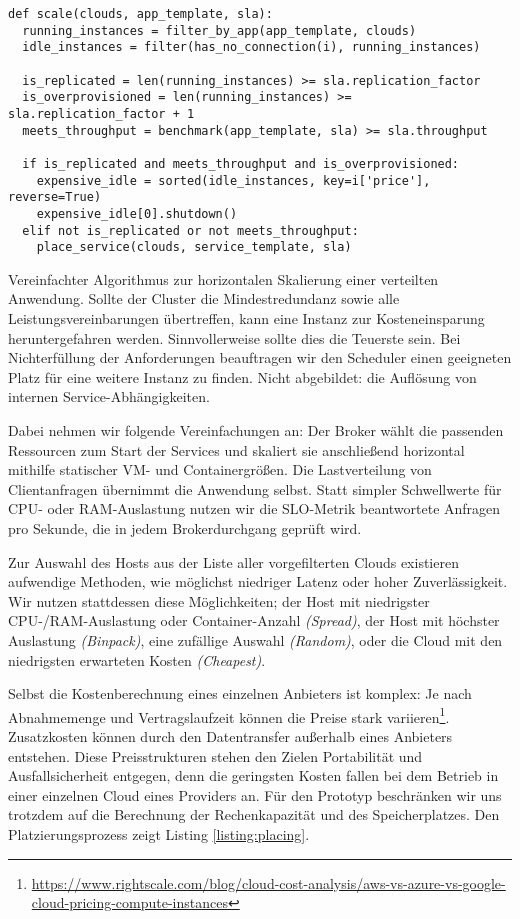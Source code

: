 \begin{listing}[ht]
\begin{verbatim}
def scale(clouds, app_template, sla):
  running_instances = filter_by_app(app_template, clouds)
  idle_instances = filter(has_no_connection(i), running_instances)
	
  is_replicated = len(running_instances) >= sla.replication_factor
  is_overprovisioned = len(running_instances) >= sla.replication_factor + 1
  meets_throughput = benchmark(app_template, sla) >= sla.throughput

  if is_replicated and meets_throughput and is_overprovisioned:
    expensive_idle = sorted(idle_instances, key=i['price'], reverse=True)
    expensive_idle[0].shutdown()
  elif not is_replicated or not meets_throughput:
    place_service(clouds, service_template, sla)
\end{verbatim}
\caption{Vereinfachter Algorithmus zur horizontalen Skalierung einer verteilten Anwendung. Sollte der Cluster die Mindestredundanz sowie alle Leistungsvereinbarungen übertreffen, kann eine Instanz zur Kosteneinsparung heruntergefahren werden. Sinnvollerweise sollte dies die Teuerste sein. Bei Nichterfüllung der Anforderungen beauftragen wir den Scheduler einen geeigneten Platz für eine weitere Instanz zu finden. Nicht abgebildet: die Auflösung von internen Service-Abhängigkeiten.}
\label{listing:scaling}
\end{listing}

Dabei nehmen wir folgende Vereinfachungen an: Der Broker wählt die passenden Ressourcen zum Start der Services und skaliert sie anschließend horizontal mithilfe statischer VM- und Containergrößen. Die Lastverteilung von Clientanfragen übernimmt die Anwendung selbst. Statt simpler Schwellwerte für CPU- oder RAM-Auslastung nutzen wir die SLO-Metrik beantwortete Anfragen pro Sekunde, die in jedem Brokerdurchgang geprüft wird.

Zur Auswahl des Hosts aus der Liste aller vorgefilterten Clouds existieren aufwendige Methoden, wie möglichst niedriger Latenz oder hoher Zuverlässigkeit. Wir nutzen stattdessen diese Möglichkeiten; der Host mit niedrigster CPU-/RAM-Auslastung oder Container-Anzahl \emph{(Spread)}, der Host mit höchster Auslastung \emph{(Binpack)}, eine zufällige Auswahl \emph{(Random)}, oder die Cloud mit den niedrigsten erwarteten Kosten \emph{(Cheapest)}.

Selbst die Kostenberechnung eines einzelnen Anbieters ist komplex: Je nach Abnahmemenge und Vertragslaufzeit können die Preise stark variieren\footnote{\url{https://www.rightscale.com/blog/cloud-cost-analysis/aws-vs-azure-vs-google-cloud-pricing-compute-instances}}. Zusatzkosten können durch den Datentransfer außerhalb eines Anbieters entstehen. Diese Preisstrukturen stehen den Zielen Portabilität und Ausfallsicherheit entgegen, denn die geringsten Kosten fallen bei dem Betrieb in einer einzelnen Cloud eines Providers an. Für den Prototyp beschränken wir uns trotzdem auf die Berechnung der Rechenkapazität und des Speicherplatzes. Den Platzierungsprozess zeigt Listing \ref{listing:placing}.

